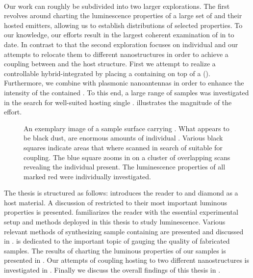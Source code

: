 	\\
   	Our work can roughly be subdivided into two larger explorations. The first revolves around charting the luminescence properties of a large set of \nds and their hosted emitters, allowing us to establish distributions of selected \siv properties. To our knowledge, our efforts result in the largest coherent examination of \sivs in \nds to date. In contrast to that the second exploration focuses on individual \nds and our attempts to relocate them to different nanostructures in order to achieve a coupling between \sivs and the host structure. First we attempt to realize a controllable hybrid-integrated \sps by placing a \nd containing \sivs on top of a \vcsel (\VCSEL). Furthermore, we combine \nds with plasmonic nanoantennas in order to enhance the \pl intensity of the contained \sivs.
   	To this end, a large range of samples was investigated in the search for well-suited \nds hosting single \sivs.  illustrates the magnitude of the effort.

   	\begin{figure}[htbp]
   		\centering
   		\caption[A sample showing an enormous amount of \nds]{An exemplary image of a sample surface carrying \nds. What appears to be black dust, are enormous amounts of individual \nds. Various black squares indicate areas that where scanned in search of \nds suitable for coupling. The blue square zooms in on a cluster of overlapping scans revealing the individual \nds present. The luminescence properties of all \nds marked red were individually investigated.}
   		\label{fig::milky_way1}
   	\end{figure}

	The thesis is structured as follows:  introduces the reader to \ccs and diamond as a host material. A discussion of \sivs restricted to their most important luminous properties is presented.  familiarizes the reader with the essential experimental setup and methods deployed in this thesis to study \siv luminescence. Various relevant methods of synthesizing sample \nds containing \sivs are presented and discussed in .  is dedicated to the important topic of gauging the quality of fabricated samples. The results of charting the luminous properties of our \nds samples is presented in . Our attempts of coupling \nds hosting \sivs to two different nanostructures is investigated in . Finally we discuss the overall findings of this thesis in .
